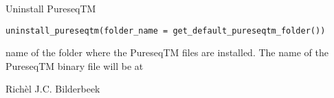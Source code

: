 \documentclass[letterpaper]{book}
\begin{document}
%
\begin{Description}\relax
Uninstall PureseqTM
\end{Description}
%
\begin{Usage}
\begin{verbatim}
uninstall_pureseqtm(folder_name = get_default_pureseqtm_folder())
\end{verbatim}
\end{Usage}
%
\begin{Arguments}
\begin{ldescription}
\item[\code{folder\_name}] name of the folder
where the PureseqTM files are installed.
The name of the PureseqTM binary file will be at
\end{ldescription}
\end{Arguments}
%
\begin{Author}\relax
Richèl J.C. Bilderbeek
\end{Author}
\printindex{}
\end{document}
